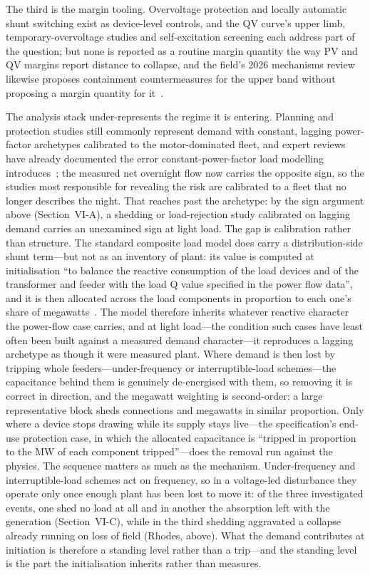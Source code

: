 \documentclass[journal]{IEEEtran}
\begin{document}
The third is the margin tooling. Overvoltage protection and locally automatic
shunt switching exist as device-level controls, and the QV curve's upper limb,
temporary-overvoltage studies and self-excitation screening each address part of
the question; but none is reported as a routine margin quantity the way PV and
QV margins report distance to collapse, and the field's 2026 mechanisms review
likewise proposes containment countermeasures for the upper band without
proposing a margin quantity for it~\cite{vournas2026review}.

The analysis stack under-represents the regime it is entering. Planning and
protection studies still commonly represent demand with constant, lagging
power-factor archetypes calibrated to the motor-dominated fleet, and expert
reviews have already documented the error constant-power-factor load modelling
introduces~\cite{cigre_tb719,epri_loadmodel}; the measured net overnight flow
now carries the opposite sign, so the studies most responsible for revealing the
risk are calibrated to a fleet that no longer describes the night. That reaches
past the archetype: by the sign argument above (Section~VI-A), a shedding or load-rejection study calibrated on lagging demand carries an unexamined sign at light load. The gap is calibration rather than structure. The standard composite load model does carry a distribution-side shunt term---but not as an inventory of plant: its value is computed at initialisation ``to balance the reactive consumption of the load devices and of the transformer and feeder with the load Q value specified in the power flow data'', and it is then allocated across the load components in proportion to each one's share of megawatts~\cite{wecc_cmpldw}. The model therefore inherits whatever reactive character the power-flow case carries, and at light load---the condition such cases have least often been built against a measured demand character---it reproduces a lagging archetype as though it were measured plant. Where demand is then lost by tripping whole feeders---under-frequency or interruptible-load schemes---the capacitance behind them is genuinely de-energised with them, so removing it is correct in direction, and the megawatt weighting is second-order: a large representative block sheds connections and megawatts in similar proportion. Only where a device stops drawing while its supply stays live---the specification's end-use protection case, in which the allocated capacitance is ``tripped in proportion to the MW of each component tripped''---does the removal run against the physics. The sequence matters as much as the mechanism. Under-frequency and interruptible-load schemes act on frequency, so in a voltage-led disturbance they operate only once enough plant has been lost to move it: of the three investigated events, one shed no load at all and in another the absorption left with the generation (Section~VI-C), while in the third shedding aggravated a collapse already running on loss of field (Rhodes, above). What the demand contributes at initiation is therefore a standing level rather than a trip---and the standing level is the part the initialisation inherits rather than measures.
\end{document}
